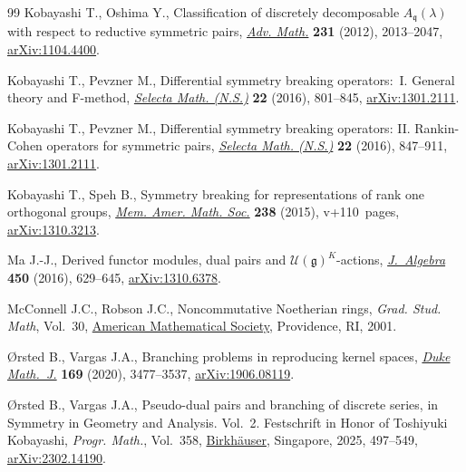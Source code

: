 \documentclass[pdftex]{sigma}
\numberwithin{equation}{section}
\theoremstyle{definition}
\begin{document}
\begin{thebibliography}{99}
Kobayashi T., Oshima Y., Classification of discretely decomposable
 {$A_{\mathfrak{q}}(\lambda)$} with respect to reductive symmetric pairs,
 \href{https://doi.org/10.1016/j.aim.2012.07.006}{\textit{Adv. Math.}}
 \textbf{231} (2012), 2013--2047,
 \href{http://arxiv.org/abs/1104.4400}{arXiv:1104.4400}.

Kobayashi T., Pevzner M., Differential symmetry breaking operators:~{I}.
 {G}eneral theory and {F}-method,
 \href{https://doi.org/10.1007/s00029-015-0207-9}{\textit{Selecta Math.
 (N.S.)}} \textbf{22} (2016), 801--845,
 \href{http://arxiv.org/abs/1301.2111}{arXiv:1301.2111}.

Kobayashi T., Pevzner M., Differential symmetry breaking operators: {II}.
 {R}ankin-{C}ohen operators for symmetric pairs,
 \href{https://doi.org/10.1007/s00029-015-0208-8}{\textit{Selecta Math.
 (N.S.)}} \textbf{22} (2016), 847--911,
 \href{http://arxiv.org/abs/1301.2111}{arXiv:1301.2111}.

Kobayashi T., Speh B., Symmetry breaking for representations of rank one
 orthogonal groups, \href{https://doi.org/10.1090/memo/1126}{\textit{Mem.
 Amer. Math. Soc.}} \textbf{238} (2015), v+110~pages,
 \href{http://arxiv.org/abs/1310.3213}{arXiv:1310.3213}.

Ma J.-J., Derived functor modules, dual pairs and
 {$\mathcal{U}(\mathfrak{g})^K$}-actions,
 \href{https://doi.org/10.1016/j.jalgebra.2015.11.016}{\textit{J.~Algebra}}
 \textbf{450} (2016), 629--645,
 \href{http://arxiv.org/abs/1310.6378}{arXiv:1310.6378}.

McConnell J.C., Robson J.C., Noncommutative {N}oetherian rings, \textit{Grad.
 Stud. Math}, Vol.~30, \href{https://doi.org/10.1090/gsm/030}{American Mathematical Society},
 Providence, RI, 2001.

{\O}rsted B., Vargas J.A., Branching problems in reproducing kernel spaces,
 \href{https://doi.org/10.1215/00127094-2020-0032}{\textit{Duke Math.~J.}}
 \textbf{169} (2020), 3477--3537,
 \href{http://arxiv.org/abs/1906.08119}{arXiv:1906.08119}.

{\O}rsted B., Vargas J.A., Pseudo-dual pairs and branching of discrete series,
 in Symmetry in Geometry and Analysis. {V}ol.~2. {F}estschrift in Honor of
 {T}oshiyuki {K}obayashi, \textit{Progr. Math.}, Vol.~358,
 \href{https://doi.org/10.1007/978-981-97-7662-7_11}{Birkh\"auser}, Singapore,
 2025, 497--549, \href{http://arxiv.org/abs/2302.14190}{arXiv:2302.14190}.


\end{thebibliography}
\end{document}
